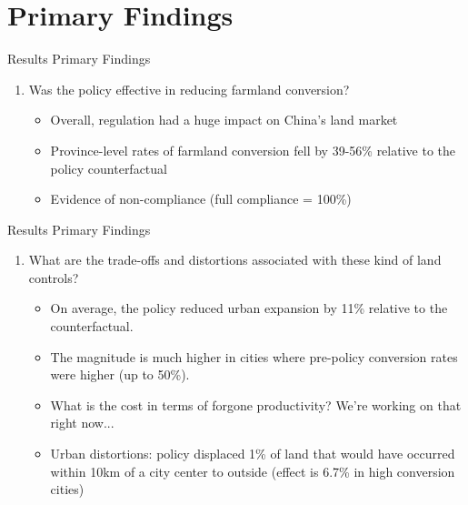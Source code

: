 \documentclass[newPxFont]{beamer}
\begin{document}
%
%
\section{Primary Findings}


\begin{frame}[c]{Results}
	Primary Findings	
	\begin{enumerate}   
		\item{Was the policy effective in reducing farmland conversion?}  
		\begin{itemize}
			\item{Overall, regulation had a huge impact on China's land market}
			\item{Province-level rates of farmland conversion fell by 39-56\% relative to the policy counterfactual}
			\item{Evidence of non-compliance (full compliance = 100\%)}
		\end{itemize}
	\end{enumerate}	
\end{frame}


\begin{frame}[c]{Results}
	Primary Findings	
	\begin{enumerate}   
		\item{What are the trade-offs and distortions associated with these kind of land controls?}
		\begin{itemize}
			\item{On average, the policy reduced urban expansion by 11\% relative to the counterfactual.}
			\item{The magnitude is much higher in cities where pre-policy conversion rates were higher (up to 50\%).}
			\item{What is the cost in terms of forgone productivity?  We're working on that right now...}
			\item{Urban distortions: policy displaced 1\% of land that would have occurred within 10km of a city center to outside (effect is 6.7\% in high conversion cities)}
		\end{itemize}
	\end{enumerate}	
\end{frame}
\end{document}
